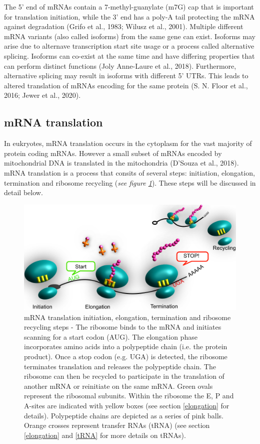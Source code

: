 \documentclass[12pt,openany]{book}
\begin{document}
The 5' end of mRNAs contain a 7-methyl-guanylate (m7G) cap that is
important for translation initiation, while the 3' end has a poly-A tail
protecting the mRNA against degradation (Grifo et al., 1983; Wilusz et
al., 2001). Multiple different mRNA variants (also called isoforms) from
the same gene can exist. Isoforms may arise due to alternave
transcription start site usage or a process called alternative splicing.
Isoforms can co-exist at the same time and have differing properties
that can perform distinct functions (Joly Anne-Laure et al., 2018).
Furthermore, alternative splicing may result in isoforms with different
5' UTRs. This leads to altered translation of mRNAs encoding for the
same protein (S. N. Floor et al., 2016; Jewer et al., 2020).

\subsection{mRNA translation} \label{translation}

In eukryotes, mRNA translation occurs in the cytoplasm for the vast
majority of protein coding mRNAs. However a small subset of mRNAs
encoded by mitochondrial DNA is translated in the mitochondria (D'Souza
et al., 2018). mRNA translation is a process that consits of several
steps: initiation, elongation, termination and ribosome recycling
(\emph{see figure \ref{fig:doodlemRNASteps}}). These steps will be
discussed in detail below.

\begin{figure}
  \includegraphics{./figures/doodleTranslation.pdf}
  \caption{mRNA translation initiation, elongation, termination and ribosome recycling steps - The ribosome binds to the mRNA and initiates scanning for a start codon (AUG). The elongation phase incorporates amino acids into a polypeptide chain (i.e. the protein product). Once a stop codon (e.g. UGA) is detected, the ribosome terminates translation and releases the polypeptide chain. The ribosome can then be recycled to participate in the translation of another mRNA or reinitiate on the same mRNA. Green ovals represent the ribosomal subunits. Within the ribosome the E, P and A-sites are indicated with yellow boxes (see section \ref{elongation} for details). Polypeptide chains are depicted as a series of pink balls. Orange crosses represent transfer RNAs (tRNA) (see section \ref{elongation} and \ref{tRNA} for more details on tRNAs).  \label{fig:doodlemRNASteps}}
\end{figure}
\end{document}
